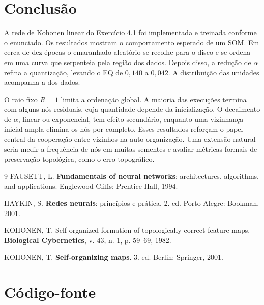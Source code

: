 \documentclass[12pt,a4paper,oneside]{article}
\renewcommand{\refname}{Referências}
\begin{document}
\section{Conclusão}

A rede de Kohonen linear do Exercício 4.1 foi implementada e treinada
conforme o enunciado. Os resultados mostram o comportamento esperado de um
SOM. Em cerca de dez épocas o emaranhado aleatório se recolhe para o disco e
se ordena em uma curva que serpenteia pela região dos dados. Depois disso, a
redução de $\alpha$ refina a quantização, levando o EQ de $0{,}140$ a
$0{,}042$. A distribuição das unidades acompanha a dos dados.

O raio fixo $R=1$ limita a ordenação global. A maioria das execuções
termina com alguns nós residuais, cuja quantidade depende da inicialização.
O decaimento de $\alpha$, linear ou exponencial, tem efeito secundário,
enquanto uma vizinhança inicial ampla elimina os nós por completo. Esses
resultados reforçam o papel central da cooperação entre vizinhos na
auto-organização. Uma extensão natural seria medir a frequência de nós em
muitas sementes e avaliar métricas formais de preservação topológica, como o
erro topográfico.

\renewcommand{\refname}{Referências}
\begin{thebibliography}{9}
\makeatletter\renewcommand\@biblabel[1]{}\makeatother
\setlength{\itemindent}{-\leftmargin}\singlespacing
FAUSETT, L. \textbf{Fundamentals of neural networks}: architectures,
algorithms, and applications. Englewood Cliffs: Prentice Hall, 1994.

HAYKIN, S. \textbf{Redes neurais}: princípios e prática. 2. ed. Porto
Alegre: Bookman, 2001.

KOHONEN, T. Self-organized formation of topologically correct feature maps.
\textbf{Biological Cybernetics}, v. 43, n. 1, p. 59--69, 1982.

KOHONEN, T. \textbf{Self-organizing maps}. 3. ed. Berlin: Springer, 2001.
\end{thebibliography}

\appendix
\section{Código-fonte}
\label{ap:codigo}

\end{document}
